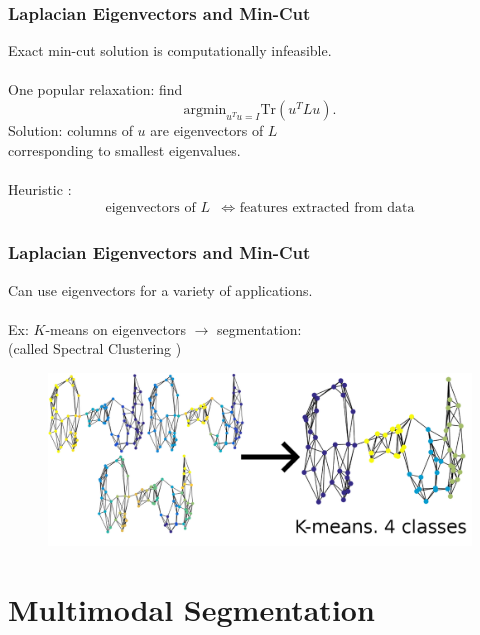 \documentclass{beamer}
\begin{document}
\begin{frame}
  \frametitle{Laplacian Eigenvectors and Min-Cut}
  Exact min-cut solution is computationally infeasible.\\~\\
  One popular relaxation: find
  \[\text{argmin}_{u^Tu = I}\text{Tr}\left(u^TLu\right).\]
  Solution: columns of $u$ are eigenvectors of $L$\\
  \hspace*{20pt}corresponding to smallest eigenvalues.\\~\\
  Heuristic \cite{vonLuxburg07}:
  \begin{align*}
    \text{eigenvectors of }L &\iff \text{ features extracted from data}
  \end{align*}

\end{frame}

\begin{frame}
  \frametitle{Laplacian Eigenvectors and Min-Cut}
  Can use eigenvectors for a variety of applications. \\~\\
  Ex: $K$-means on eigenvectors $\to$ segmentation:\\
  (called Spectral Clustering \cite{vonLuxburg07})
  \begin{figure}
    \centering
    \includegraphics[width=\textwidth]{./Images/SyntheticGraph/combinedClassification.png}
  \end{figure}
\end{frame}


\section{Multimodal Segmentation}
\end{document}
